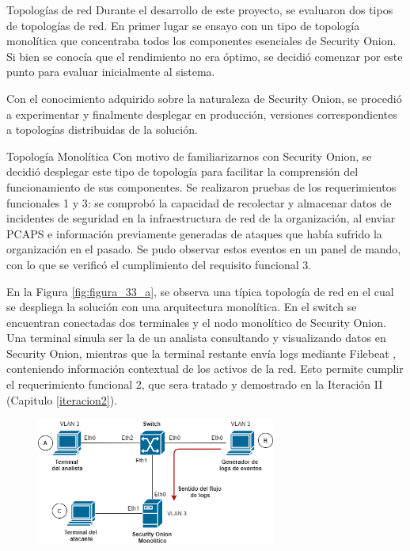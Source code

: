     
    \begin{section}{Topologías de red }
        Durante el desarrollo de este proyecto, se evaluaron dos tipos de topologías de red. En primer lugar se ensayo con un tipo de topología monolítica que concentraba todos los componentes esenciales de Security Onion. Si bien se conocía que el rendimiento no era óptimo, se decidió comenzar por este punto para evaluar inicialmente al sistema. \par
        Con el conocimiento adquirido sobre la naturaleza de Security Onion, se procedió a experimentar y finalmente desplegar en producción, versiones correspondientes a topologías distribuidas de la solución. \par

        \begin{subsection} {Topología Monolítica}
            Con motivo de familiarizarnos con Security Onion, se decidió desplegar este tipo de topología para facilitar la comprensión del funcionamiento de sus componentes. Se realizaron pruebas de los requerimientos funcionales 1 y 3: se comprobó la capacidad de recolectar y almacenar datos de incidentes de seguridad en la infraestructura de red de la organización, al enviar PCAPS e información previamente generadas de ataques que había sufrido la organización en el pasado. Se pudo observar estos eventos en un panel de mando, con lo que se verificó el cumplimiento del requisito funcional 3.\par 
            En la Figura \ref{fig:figura_33_a}, se observa una típica topología de red en el cual se despliega la solución con una arquitectura monolítica. En el switch se encuentran conectadas dos terminales y el nodo monolítico de Security Onion. Una terminal simula ser la de un analista consultando y visualizando datos en Security Onion, mientras que la terminal restante envía logs mediante Filebeat \cite{filebeat}, conteniendo información contextual de los activos de la red. Esto permite cumplir el requerimiento funcional 2, que sera tratado y demostrado en la Iteración II (Capitulo \ref{iteracion2}). 
            \begin{figure}[H]
            \centering
            \includegraphics[width=0.7\textwidth]{./iteracion_1_imagenes/figura_33_a_topologia_de_prueba_1.png}

\end{figure}
\end{subsection}
\end{section}
